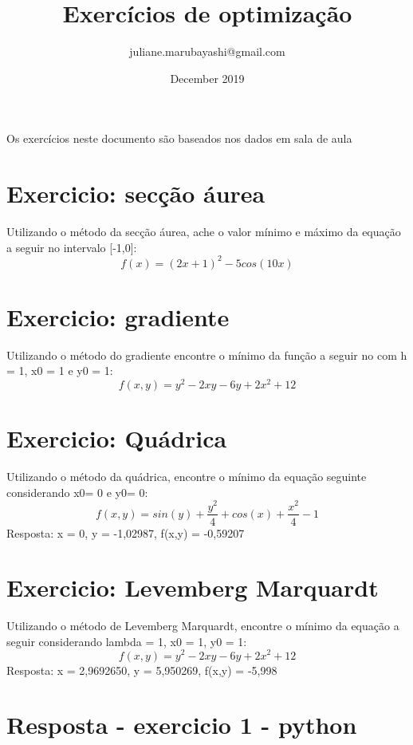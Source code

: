 \documentclass{article}
\title{Exercícios de optimização}
\author{juliane.marubayashi@gmail.com}
\date{December 2019}
\begin{document}
\maketitle

Os exercícios neste documento são baseados nos dados em sala de aula
\section{Exercicio: secção áurea}
Utilizando o método da secção áurea, ache o valor mínimo e máximo da equação a seguir no intervalo [-1,0]:
$$ f(x) = (2x+1)^2 -5cos(10x)$$ 

\section{Exercicio: gradiente}
Utilizando o método do gradiente encontre o mínimo da função a seguir no com h = 1, x0 = 1 e y0 = 1: 
$$ f(x,y) = y^2 - 2xy - 6y + 2x^2 +12$$

\section{Exercicio: Quádrica}
Utilizando o método da quádrica, encontre o mínimo da equação seguinte considerando x0= 0 e y0= 0:
$$ f(x,y) = sin(y)+ \frac{y^2}{4} + cos(x) + \frac{x^2}{4} -1$$
Resposta: x = 0, y = -1,02987, f(x,y) = -0,59207

\section{Exercicio: Levemberg Marquardt}
Utilizando o método de Levemberg Marquardt, encontre o mínimo da equação a seguir considerando lambda = 1, x0 = 1, y0 = 1: 
$$ f(x,y) = y^2-2xy -6y +2x^2+12$$
Resposta: x = 2,9692650, y = 5,950269, f(x,y) = -5,998


\newpage
\section{Resposta - exercicio 1 - python}
\end{document}
